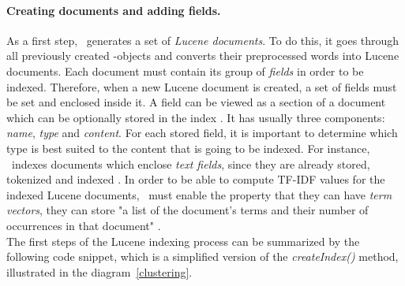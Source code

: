 \paragraph{Creating documents and adding fields.}
As a first step, \toolname\ generates a set of \textit{Lucene documents}. 
To do this, it goes through all previously created \Crash-objects and converts their preprocessed words into Lucene documents. Each document must contain its group of \textit{fields} in order to be indexed.
Therefore, when a new Lucene document is created, a set of fields must be set and enclosed inside it. 
A field can be viewed as a section of a document which can be optionally stored in the index \cite{lucenefield}. 
It has usually three components: \textit{name}, \textit{type} and \textit{content}. For each stored field, it is important to determine which type is best suited to the content that is going to be indexed. 
For instance, \toolname\ indexes documents which enclose \textit{text fields}, since they are already stored, tokenized and indexed \cite{lucenetextfield}. 
In order to be able to compute TF-IDF values for the indexed Lucene documents, \toolname\ must enable the property that they can have \textit{term vectors}, \ie they can store "a list of the document's terms and their number of occurrences in that document" \cite{lucenetermvector}. \\
The first steps of the Lucene indexing process can be summarized by the following code snippet, which is a simplified version of the \textit{createIndex()} method, illustrated in the diagram~\ref{clustering}.

